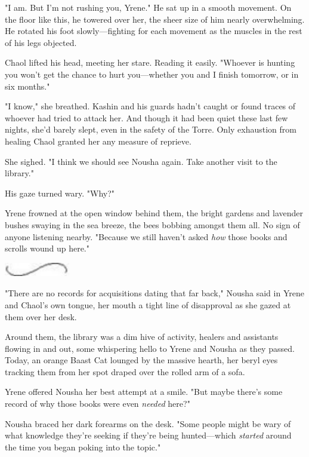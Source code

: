 "I am.
But I'm not rushing you, Yrene."
He sat up in a smooth movement.
On the floor like this, he towered over her, the sheer size of him nearly overwhelming.
He rotated his foot slowly---fighting for each movement as the muscles in the rest of his legs objected.

Chaol lifted his head, meeting her stare.
Reading it easily.
"Whoever is hunting you won't get the chance to hurt you---whether you and I finish tomorrow, or in six months."

"I know," she breathed.
Kashin and his guards hadn't caught or found traces of whoever had tried to attack her.
And though it had been quiet these last few nights, she'd barely slept, even in the safety of the Torre.
Only exhaustion from healing Chaol granted her any measure of reprieve.

She sighed.
"I think we should see Nousha again.
Take another visit to the library."

His gaze turned wary.
"Why?"

Yrene frowned at the open window behind them, the bright gardens and lavender bushes swaying in the sea breeze, the bees bobbing amongst them all.
No sign of anyone listening nearby.
"Because we still haven't asked \emph{how} those books and scrolls wound up here."

\begin{center}
	\includegraphics[width=1.12in,height=0.24in]{images/seperator}
\end{center}

"There are no records for acquisitions dating that far back," Nousha said in Yrene and Chaol's own tongue, her mouth a tight line of disapproval as she gazed at them over her desk.

Around them, the library was a dim hive of activity, healers and assistants flowing in and out, some whispering hello to Yrene and Nousha as they passed.
Today, an orange Baast Cat lounged by the massive hearth, her beryl eyes tracking them from her spot draped over the rolled arm of a sofa.

Yrene offered Nousha her best attempt at a smile.
"But maybe there's some record of why those books were even \emph{needed} here?"

Nousha braced her dark forearms on the desk.
"Some people might be wary of what knowledge they're seeking if they're being hunted---which \emph{started} around the time you began poking into the topic."

